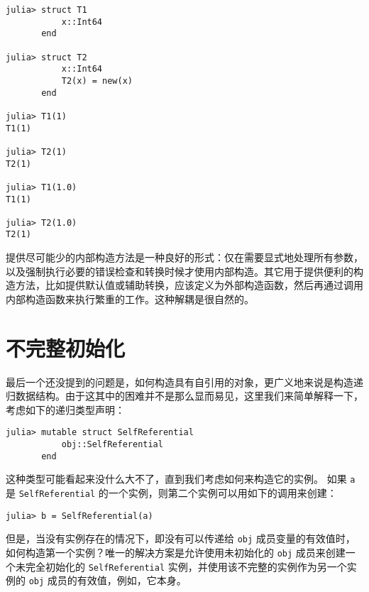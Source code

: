 \begin{verbatim}
julia> struct T1
           x::Int64
       end

julia> struct T2
           x::Int64
           T2(x) = new(x)
       end

julia> T1(1)
T1(1)

julia> T2(1)
T2(1)

julia> T1(1.0)
T1(1)

julia> T2(1.0)
T2(1)
\end{verbatim}



提供尽可能少的内部构造方法是一种良好的形式：仅在需要显式地处理所有参数，以及强制执行必要的错误检查和转换时候才使用内部构造。其它用于提供便利的构造方法，比如提供默认值或辅助转换，应该定义为外部构造函数，然后再通过调用内部构造函数来执行繁重的工作。这种解耦是很自然的。



\hypertarget{7871769496419060352}{}


\section{不完整初始化}



最后一个还没提到的问题是，如何构造具有自引用的对象，更广义地来说是构造递归数据结构。由于这其中的困难并不是那么显而易见，这里我们来简单解释一下，考虑如下的递归类型声明：




\begin{verbatim}
julia> mutable struct SelfReferential
           obj::SelfReferential
       end

\end{verbatim}



这种类型可能看起来没什么大不了，直到我们考虑如何来构造它的实例。 如果 \texttt{a} 是 \texttt{SelfReferential} 的一个实例，则第二个实例可以用如下的调用来创建：




\begin{verbatim}
julia> b = SelfReferential(a)
\end{verbatim}



但是，当没有实例存在的情况下，即没有可以传递给 \texttt{obj} 成员变量的有效值时，如何构造第一个实例？唯一的解决方案是允许使用未初始化的 \texttt{obj} 成员来创建一个未完全初始化的 \texttt{SelfReferential} 实例，并使用该不完整的实例作为另一个实例的 \texttt{obj} 成员的有效值，例如，它本身。



